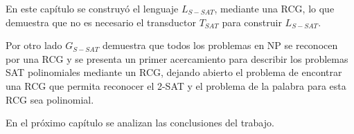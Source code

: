En este capítulo se construyó el lenguaje $L_{S-SAT}$, mediante una RCG, lo que demuestra que no es necesario el transductor $T_{SAT}$ para construir $L_{S-SAT}$.

Por otro lado $G_{S-SAT}$ demuestra que todos los problemas en NP se reconocen por una RCG y se presenta un primer acercamiento para describir los problemas SAT polinomiales mediante un RCG, dejando abierto el problema de encontrar una RCG que permita reconocer el 2-SAT y el problema de la palabra para esta RCG sea polinomial.

En el próximo capítulo se analizan las conclusiones del trabajo.
